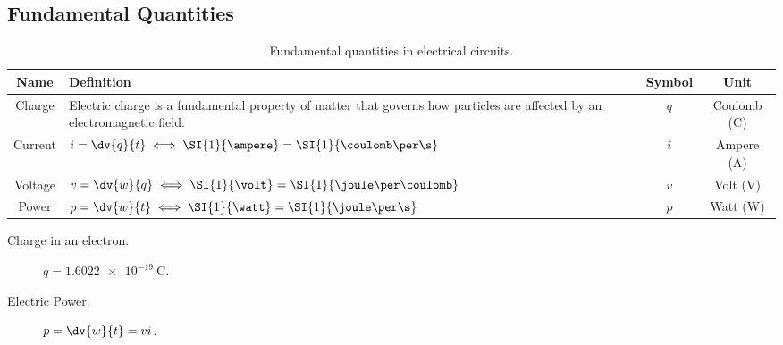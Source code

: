 \documentclass{article}
\begin{document}
\subsection{Fundamental Quantities}
\begingroup
\renewcommand{\arraystretch}{1.5}
\begin{table}[H]
    \centering
    \begin{tabular}{c >{\centering}p{} c c}
        \toprule
        \textbf{Name} & \textbf{Definition}                                                                                                      & \textbf{Symbol}           & \textbf{Unit} \\
        \midrule
        Charge        & Electric charge is a fundamental property of matter that governs how particles are affected by an electromagnetic field.
                      & $q$                                                                                                                      & Coulomb (\unit{\coulomb})                 \\
        \midrule
        Current       & $\displaystyle i = \dv{q}{t}\iff\SI{1}{\ampere} = \SI{1}{\coulomb\per\s}$
                      & $i$                                                                                                                      & Ampere (\unit{\ampere})                   \\
        \midrule
        Voltage       & $\displaystyle v = \dv{w}{q}\iff\SI{1}{\volt} = \SI{1}{\joule\per\coulomb}$
                      & $v$                                                                                                                      & Volt (\unit{\volt})                       \\
        \midrule
        Power         & $\displaystyle p = \dv{w}{t}\iff\SI{1}{\watt} = \SI{1}{\joule\per\s}$
                      & $p$                                                                                                                      & Watt (\unit{\watt})                       \\
        \bottomrule
    \end{tabular}
    \caption{Fundamental quantities in electrical circuits.}
\end{table}
\endgroup
\begin{description}
    \item[Charge in an electron.] $q = \SI{1.6022e-19}{\coulomb}$.
    \item[Electric Power.] $\displaystyle p = \dv{w}{t} = vi$.
\end{description}
\end{document}
